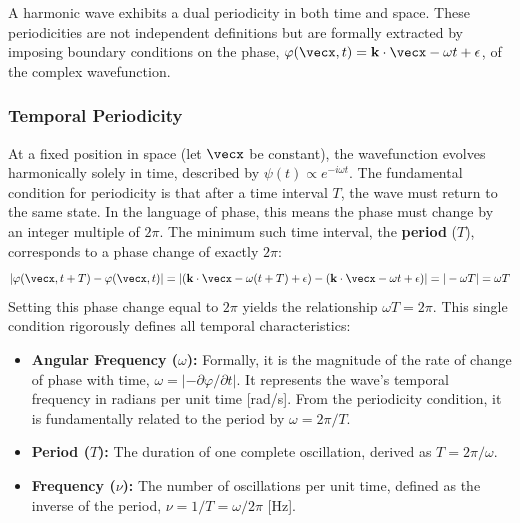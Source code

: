 \begin{proposition}
A harmonic wave exhibits a dual periodicity in both time and space. These periodicities are not independent definitions but are formally extracted by imposing boundary conditions on the phase, $\varphi(\vecx, t) = \vecbf{k} \cdot \vecx - \omega t + \epsilon$, of the complex wavefunction.

\subsubsection*{Temporal Periodicity}
At a fixed position in space (let $\vecx$ be constant), the wavefunction evolves harmonically solely in time, described by $\psi(t) \propto e^{-i\omega t}$. The fundamental condition for periodicity is that after a time interval $T$, the wave must return to the same state. In the language of phase, this means the phase must change by an integer multiple of $2\pi$. The minimum such time interval, the \textbf{period} ($T$), corresponds to a phase change of exactly $2\pi$:
$$ |\varphi(\vecx, t+T) - \varphi(\vecx, t)| = |(\vecbf{k} \cdot \vecx - \omega(t+T) + \epsilon) - (\vecbf{k} \cdot \vecx - \omega t + \epsilon)| = |-\omega T| = \omega T $$
Setting this phase change equal to $2\pi$ yields the relationship $\omega T = 2\pi$. This single condition rigorously defines all temporal characteristics:
\begin{itemize}
    \item \textbf{Angular Frequency ($\omega$):} Formally, it is the magnitude of the rate of change of phase with time, $\omega = |-\partial\varphi/\partial t|$. It represents the wave's temporal frequency in radians per unit time [rad/s]. From the periodicity condition, it is fundamentally related to the period by $\omega = 2\pi/T$.
    \item \textbf{Period ($T$):} The duration of one complete oscillation, derived as $T = 2\pi/\omega$.
    \item \textbf{Frequency ($\nu$):} The number of oscillations per unit time, defined as the inverse of the period, $\nu = 1/T = \omega/2\pi$ [Hz].
\end{itemize}


\end{proposition}
